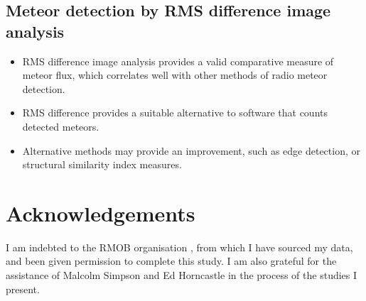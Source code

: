 \subsection{Meteor detection by RMS difference image analysis}
\begin{itemize}
	\item RMS difference image analysis provides a valid comparative measure of meteor flux, which correlates well with other methods of radio meteor detection.
	\item RMS difference provides a suitable alternative to software that counts detected meteors.
	\item Alternative methods may provide an improvement, such as edge detection, or structural similarity index measures.
\end{itemize}

\section{Acknowledgements}
I am indebted to the RMOB organisation \cite{rmob}, from which I have sourced my data, and been given permission to complete this study. I am also grateful for the assistance of Malcolm Simpson and Ed Horncastle in the process of the studies I present.